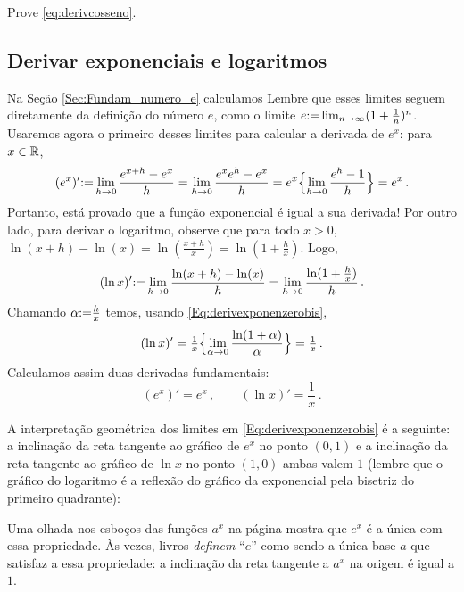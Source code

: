 \begin{exo}
Prove \eqref{eq:derivcosseno}.
\end{exo}

\subsection{Derivar exponenciais e logaritmos}
Na Seção \ref{Sec:Fundam_numero_e} calculamos
Lembre que esses limites seguem diretamente da definição do número
$e$, como o limite $e{:=} \lim_{n\to \infty}(1+\frac1n)^n$.
Usaremos agora o primeiro desses limites para calcular
a derivada de $e^x$: para $x\in \mathbb{R}$,
$$
(e^x)'{:=}\lim_{h\to 0}\frac{e^{x+h}-e^x}{h}=
\lim_{h\to 0}\frac{e^{x}e^h-e^x}{h}=
e^{x}\Bigl\{\lim_{h\to 0}\frac{e^h-1}{h}\Big\}=e^x\,.
$$
Portanto, está provado que a função exponencial é igual a sua derivada!
Por outro lado, para derivar o logaritmo, observe que 
para todo $x>0$,
$\ln(x+h)-\ln (x)=\ln(\frac{x+h}{x})=\ln(1+\frac{h}{x})$. Logo,
$$(\ln x)'{:=} \lim_{h\to 0}\frac{\ln(x+h)-\ln(x)}{h}=\lim_{h\to
0}\frac{\ln(1+\frac{h}{x})}{h}\,.$$
Chamando $\alpha{:=}\frac{h}{x}$ temos, usando \eqref{Eq:derivexponenzerobis},
$$(\ln x)'=\tfrac1x\Bigl\{\lim_{\alpha\to 
0}\frac{\ln(1+\alpha)}{\alpha}\Bigr\}=\tfrac1x\,.
$$
Calculamos assim duas derivadas fundamentais:
$$
\boxed{
(e^x)'=e^x\,,\quad\quad (\ln x)'=\frac{1}{x}\,.
}
$$

\begin{obs}
A interpretação geométrica dos limites em
\eqref{Eq:derivexponenzerobis} é a seguinte: a inclinação da reta
tangente ao gráfico de $e^x$ no ponto $(0,1)$ e a inclinação da reta
tangente ao gráfico de $\ln x$ no ponto $(1,0)$ ambas valem $1$ (lembre que o
gráfico do logaritmo é a reflexão do gráfico da exponencial pela bisetriz do
primeiro quadrante):
\begin{center}
\begin{bmlimage}\end{bmlimage}
\end{center}
Uma olhada nos esboços das funções $a^x$ na página
\pageref{Fig:graficosdifbases} mostra que $e^x$ é a única com essa propriedade.
Às vezes, livros \emph{definem} ``$e$'' como sendo a única base $a$ que
satisfaz a essa propriedade: a inclinação da reta tangente a $a^x$ na origem é
igual a $1$.
\end{obs}

